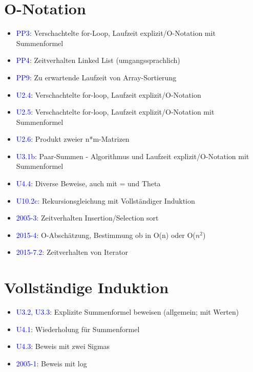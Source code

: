 \documentclass[a4paper]{article}
\newcommand{\ub}[1]{\textcolor{blue}{#1}}
\begin{document}
\section{O-Notation}
\begin{itemize}
  \item \ub{PP3}: Verschachtelte for-Loop, Laufzeit explizit/O-Notation mit Summenformel
  \item \ub{PP4}: Zeitverhalten Linked List (umgangssprachlich)
  \item \ub{PP9}: Zu erwartende Laufzeit von Array-Sortierung
  \item \ub{U2.4}: Verschachtelte for-loop, Laufzeit explizit/O-Notation
  \item \ub{U2.5}: Verschachtelte for-loop, Laufzeit explizit/O-Notation mit Summenformel
  \item \ub{U2.6}: Produkt zweier n*m-Matrizen
  \item \ub{U3.1b}: Paar-Summen - Algorithmus und Laufzeit explizit/O-Notation
    mit Summenformel
  \item \ub{U4.4}: Diverse Beweise, auch mit = und Theta
  \item \ub{U10.2c}: Rekursionsgleichung mit Vollständiger Induktion
  \item \ub{2005-3}: Zeitverhalten Insertion/Selection sort
  \item \ub{2015-4}: O-Abschätzung, Bestimmung ob in O(n) oder O($n^2$)
  \item \ub{2015-7.2}: Zeitverhalten von Iterator
\end{itemize}

\section{Vollständige Induktion}
\begin{itemize}
  \item \ub{U3.2, U3.3}: Explizite Summenformel beweisen (allgemein; mit Werten)
  \item \ub{U4.1}: Wiederholung für Summenformel
  \item \ub{U4.3}: Beweis mit zwei Sigmas
  \item \ub{2005-1}: Beweis mit log
\end{itemize}
\end{document}
